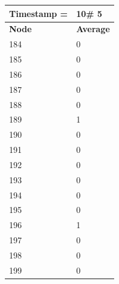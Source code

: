 \begin{tabular}{|l||l|}
\hline
\textbf{Timestamp =} & \textbf{10}\# 5\\\hline
	\textbf{Node} & \textbf{Average} \\ \hline
\hline
	184 & 0 \\ \hline
	185 & 0 \\ \hline
	186 & 0 \\ \hline
	187 & 0 \\ \hline
	188 & 0 \\ \hline
	189 & 1 \\ \hline
	190 & 0 \\ \hline
	191 & 0 \\ \hline
	192 & 0 \\ \hline
	193 & 0 \\ \hline
	194 & 0 \\ \hline
	195 & 0 \\ \hline
	196 & 1 \\ \hline
	197 & 0 \\ \hline
	198 & 0 \\ \hline
	199 & 0 \\ \hline
\end{tabular}

